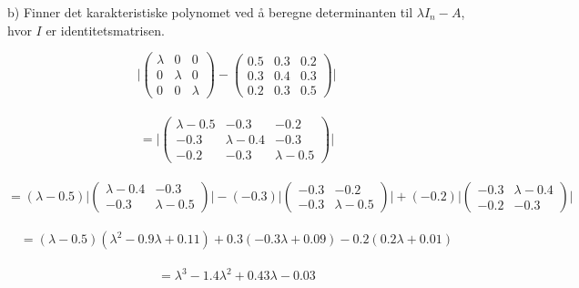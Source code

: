 \vspace{0.2in}
b) Finner det karakteristiske polynomet ved å beregne determinanten til $\lambda I_n-A$, hvor $I$ er identitetsmatrisen. 

\begin{equation}\nonumber
    \Bigg|
     \begin{pmatrix}
        \lambda & 0 & 0 \\ 0 & \lambda & 0 \\ 0 & 0 & \lambda
    \end{pmatrix} 
    - \begin{pmatrix}
        0.5 & 0.3 & 0.2 \\ 0.3 & 0.4 & 0.3 \\ 0.2 & 0.3 & 0.5
    \end{pmatrix}
    \Bigg|
\end{equation}\\
\begin{equation}\nonumber
    =
    \Bigg|
    \begin{pmatrix}
        \lambda-0.5 & -0.3 & -0.2 \\ -0.3 & \lambda-0.4 & -0.3 \\ -0.2 & -0.3 & \lambda-0.5 
    \end{pmatrix}
    \Bigg| 
\end{equation}\\
\begin{equation}\nonumber
    = (\lambda-0.5) \bigg| \begin{pmatrix}
    \lambda-0.4 & -0.3 \\ -0.3 & \lambda-0.5
    \end{pmatrix} \bigg| - (-0.3) \bigg| \begin{pmatrix}
    -0.3 & -0.2 \\ -0.3 & \lambda-0.5
    \end{pmatrix} \bigg| + (-0.2) \bigg| \begin{pmatrix}
    -0.3 & \lambda-0.4 \\ -0.2 & -0.3
    \end{pmatrix} \bigg|
\end{equation}\\ \begin{equation}\nonumber
    = (\lambda-0.5)(\lambda^2-0.9\lambda+0.11)+0.3(-0.3\lambda+0.09)-0.2(0.2\lambda+0.01)
\end{equation}\\
\begin{equation}\nonumber
    = \lambda^3-1.4\lambda^2+0.43\lambda-0.03
\end{equation}
